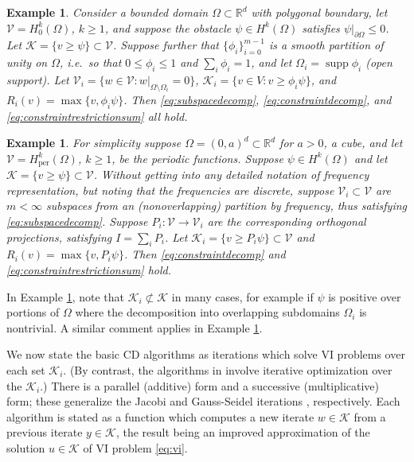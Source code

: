 \documentclass[letterpaper,final,12pt,reqno]{amsart}
\theoremstyle{cstyle}
\theoremstyle{dstyle}
\newtheorem{example}[theorem]{Example}
\numberwithin{equation}{section}
\numberwithin{figure}{section}
\numberwithin{table}{section}
\numberwithin{theorem}{section}
\newcommand{\RR}{\mathbb{R}}
\newcommand{\cK}{\mathcal{K}}
\newcommand{\cV}{\mathcal{V}}
\newcommand{\supp}{\operatorname{supp}}
\begin{document}
\begin{example}  \label{ex:domaindecomposition}  Consider a bounded domain $\Omega \subset \RR^d$ with polygonal boundary, let $\cV = H_0^k(\Omega)$, $k\ge 1$, and suppose the obstacle $\psi \in H^k(\Omega)$ satisfies $\psi|_{\partial \Omega} \le 0$.  Let $\cK = \{v \ge \psi\} \subset \cV$.  Suppose further that $\{\phi_i\}_{i=0}^{m-1}$ is a smooth partition of unity on $\Omega$, i.e.~so that $0 \le \phi_i\le 1$ and $\sum_i \phi_i = 1$, and let $\Omega_i = \supp \phi_i$ (open support).  Let $\cV_i = \{w \in \cV:w|_{\Omega \setminus \Omega_i} =0 \}$, $\cK_i = \{v \in V: v \ge \phi_i \psi\}$, and $R_i(v) = \max\{v,\phi_i \psi\}$.  Then \eqref{eq:subspacedecomp}, \eqref{eq:constraintdecomp}, and \eqref{eq:constraintrestrictionsum} all hold.
\end{example}

\begin{example}  \label{ex:frequencydecomposition}  For simplicity suppose $\Omega = (0,a)^d \subset \RR^d$ for $a>0$, a cube, and let $\cV = H_{\text{per}}^k(\Omega)$, $k\ge 1$, be the periodic functions.  Suppose $\psi \in H^k(\Omega)$ and let $\cK = \{v \ge \psi\} \subset \cV$.  Without getting into any detailed notation of frequency representation, but noting that the frequencies are discrete, suppose $\cV_i \subset \cV$ are $m<\infty$ subspaces from an (nonoverlapping) partition by frequency, thus satisfying \eqref{eq:subspacedecomp}.  Suppose $P_i:\cV \to \cV_i$ are the corresponding orthogonal projections, satisfying $I = \sum_i P_i$.  Let $\cK_i = \{v \ge P_i \psi\} \subset \cV$ and $R_i(v) = \max\{v,P_i \psi\}$.  Then \eqref{eq:constraintdecomp} and \eqref{eq:constraintrestrictionsum} hold.
\end{example}

In Example \ref{ex:domaindecomposition}, note that $\cK_i \not\subset \cK$ in many cases, for example if $\psi$ is positive over portions of $\Omega$ where the decomposition into overlapping subdomains $\Omega_i$ is nontrivial.  A similar comment applies in Example \ref{ex:frequencydecomposition}.

We now state the basic CD algorithms as iterations which solve VI problems over each set $\cK_i$.  (By contrast, the algorithms in \cite{Tai2003} involve iterative optimization over the $\cK_i$.)  There is a parallel (additive) form and a successive (multiplicative) form; these generalize the Jacobi and Gauss-Seidel iterations \cite{Greenbaum1997}, respectively.  Each algorithm is stated as a function which computes a new iterate $w\in\cK$ from a previous iterate $y \in \cK$, the result being an improved approximation of the solution $u\in \cK$ of VI problem \eqref{eq:vi}.
\end{document}
